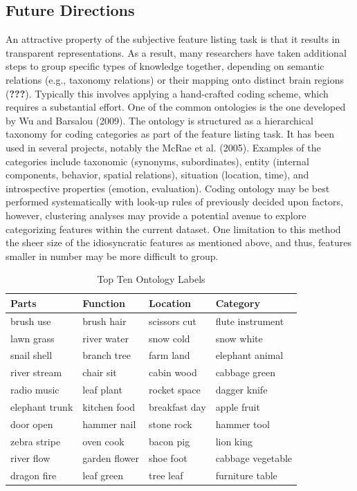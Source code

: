 \documentclass[man]{apa6}
\begin{document}
\hypertarget{future-directions}{%
\subsection{Future Directions}\label{future-directions}}

An attractive property of the subjective feature listing task is that it results in transparent representations. As a result, many researchers have taken additional steps to group specific types of knowledge together, depending on semantic relations (e.g., taxonomy relations) or their mapping onto distinct brain regions ({\textbf{???}}). Typically this involves applying a hand-crafted coding scheme, which requires a substantial effort. One of the common ontologies is the one developed by Wu and Barsalou (2009). The ontology is structured as a hierarchical taxonomy for coding categories as part of the feature listing task. It has been used in several projects, notably the McRae et al. (2005). Examples of the categories include taxonomic (synonyms, subordinates), entity (internal components, behavior, spatial relations), situation (location, time), and introspective properties (emotion, evaluation). Coding ontology may be best performed systematically with look-up rules of previously decided upon factors, however, clustering analyses may provide a potential avenue to explore categorizing features within the current dataset. One limitation to this method the sheer size of the idiosyncratic features as mentioned above, and thus, features smaller in number may be more difficult to group.

\begin{table}[t]

\caption{\label{tab:tab8}Top Ten Ontology Labels}
\centering
\begin{tabular}{llll}
\toprule
Parts & Function & Location & Category\\
\midrule
brush use & brush hair & scissors cut & flute instrument\\
lawn grass & river water & snow cold & snow white\\
snail shell & branch tree & farm land & elephant animal\\
river stream & chair sit & cabin wood & cabbage green\\
radio music & leaf plant & rocket space & dagger knife\\
\addlinespace
elephant trunk & kitchen food & breakfast day & apple fruit\\
door open & hammer nail & stone rock & hammer tool\\
zebra stripe & oven cook & bacon pig & lion king\\
river flow & garden flower & shoe foot & cabbage vegetable\\
dragon fire & leaf green & tree leaf & furniture table\\
\bottomrule
\end{tabular}
\end{table}
\end{document}

